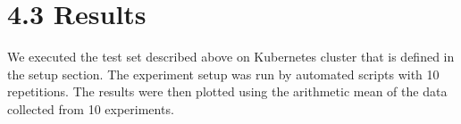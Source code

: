 \documentclass[12pt,oneandhalf,chaparabic,ceng,ms,eng,oneside,pntc]{gsufbe}
\begin{document}
\section[Results]{4.3 Results}
We executed the test set described above on Kubernetes cluster that is defined in the setup section.
The experiment setup was run by automated scripts with 10 repetitions.  The results were then plotted
using the arithmetic mean of the data collected from 10 experiments. 

% 
\end{document}
